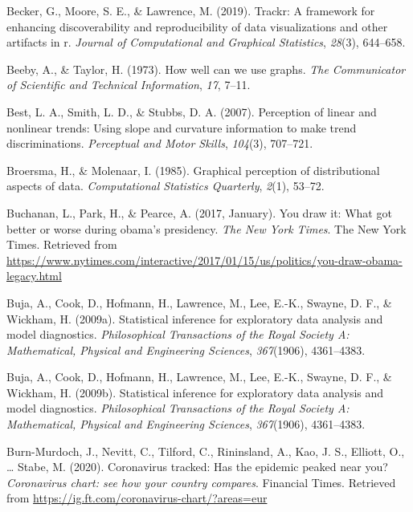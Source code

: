 \documentclass[print]{nuthesis}
\newlength{\cslhangindent}
\newenvironment{CSLReferences}[2]%
{\setlength{\parindent}{0pt}%
\everypar{\setlength{\hangindent}{\cslhangindent}}\ignorespaces}%
{\par}
\begin{document}
\begin{CSLReferences}{1}{0}
\leavevmode{}%
Becker, G., Moore, S. E., \& Lawrence, M. (2019). Trackr: A framework for enhancing discoverability and reproducibility of data visualizations and other artifacts in r. \emph{Journal of Computational and Graphical Statistics}, \emph{28}(3), 644--658.

\leavevmode{}%
Beeby, A., \& Taylor, H. (1973). How well can we use graphs. \emph{The Communicator of Scientific and Technical Information}, \emph{17}, 7--11.

\leavevmode{}%
Best, L. A., Smith, L. D., \& Stubbs, D. A. (2007). Perception of linear and nonlinear trends: Using slope and curvature information to make trend discriminations. \emph{Perceptual and Motor Skills}, \emph{104}(3), 707--721.

\leavevmode{}%
Broersma, H., \& Molenaar, I. (1985). Graphical perception of distributional aspects of data. \emph{Computational Statistics Quarterly}, \emph{2}(1), 53--72.

\leavevmode{}%
Buchanan, L., Park, H., \& Pearce, A. (2017, January). You draw it: What got better or worse during obama's presidency. \emph{The New York Times}. The New York Times. Retrieved from \url{https://www.nytimes.com/interactive/2017/01/15/us/politics/you-draw-obama-legacy.html}

\leavevmode{}%
Buja, A., Cook, D., Hofmann, H., Lawrence, M., Lee, E.-K., Swayne, D. F., \& Wickham, H. (2009a). Statistical inference for exploratory data analysis and model diagnostics. \emph{Philosophical Transactions of the Royal Society A: Mathematical, Physical and Engineering Sciences}, \emph{367}(1906), 4361--4383.

\leavevmode{}%
Buja, A., Cook, D., Hofmann, H., Lawrence, M., Lee, E.-K., Swayne, D. F., \& Wickham, H. (2009b). Statistical inference for exploratory data analysis and model diagnostics. \emph{Philosophical Transactions of the Royal Society A: Mathematical, Physical and Engineering Sciences}, \emph{367}(1906), 4361--4383.

\leavevmode{}%
Burn-Murdoch, J., Nevitt, C., Tilford, C., Rininsland, A., Kao, J. S., Elliott, O., \ldots{} Stabe, M. (2020). Coronavirus tracked: Has the epidemic peaked near you? \emph{Coronavirus chart: see how your country compares}. Financial Times. Retrieved from \url{https://ig.ft.com/coronavirus-chart/?areas=eur}


\end{CSLReferences}
\end{document}
